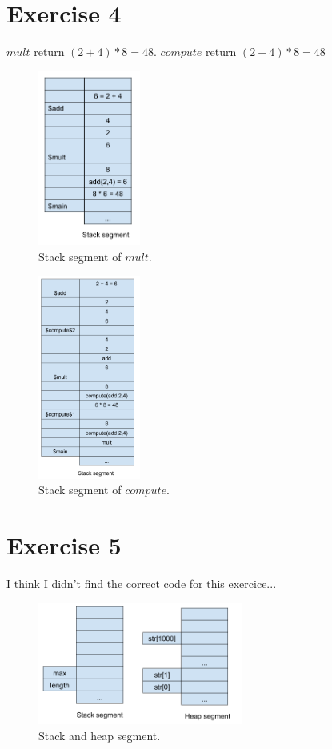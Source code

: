 \documentclass[a4paper,11pt]{report}
\begin{document}
\section*{Exercise 4}

$mult$ return $(2+4) * 8 = 48$. $compute$ return $(2+4) * 8 = 48$

\begin{figure}[h]
  \centering
  \includegraphics[width=0.3\textwidth]{figures/SOP_s06_ex4_a}
  \caption{\label{fig:ex4-a} Stack segment of $mult$.}
\end{figure}

\begin{figure}[h]
  \centering
  \includegraphics[width=0.3\textwidth]{figures/SOP_s06_ex4_b}
  \caption{\label{fig:ex4-b} Stack segment of $compute$.}
\end{figure}

\FloatBarrier

\section*{Exercise 5}

I think I didn't find the correct code for this exercice...

\begin{figure}[ht]
  \centering
  \includegraphics[width=0.6\textwidth]{figures/SOP_s06_ex5}
  \caption{\label{fig:ex5} Stack and heap segment.}
\end{figure}
\end{document}
